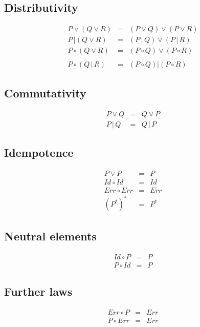 \subsection{Distributivity}
\begin{eqnarray*}
  P \vee \left( Q \vee R \right) & = & \left( P \vee Q \right) \vee \left( P \vee R \right) \\
  P \,| \left( Q \vee R \right) & = & \left( P \,|\, Q \right) \vee \left( P \,|\, R \right) \\
  P \circ \left( Q \vee R \right) & = & \left( P \circ Q \right) \vee \left( P \circ R \right) \\
  & & \\
  P \circ \left( Q \,|\, R \right) & = & \left( P \circ Q \right) | \left( P \circ R \right)
\end{eqnarray*}

\subsection{Commutativity}
\begin{eqnarray*}
  P \vee Q & = & Q \vee P \\
  P \,|\, Q & = & Q \,|\, P
\end{eqnarray*}

\subsection{Idempotence}
\begin{eqnarray*}
  P \vee P & = & P \\
  Id \circ Id & = & Id \\
  Err \circ Err & = & Err \\
  (P^*)^* & = & P^*
\end{eqnarray*}

\subsection{Neutral elements}
\begin{eqnarray*}
  Id \circ P & = & P \\
  P \circ Id & = & P
\end{eqnarray*}

\subsection{Further laws}
\begin{eqnarray*}
  Err \circ P & = & Err \\
  P \circ Err & = & Err
\end{eqnarray*}
